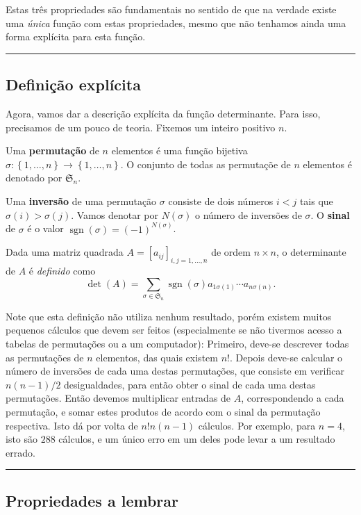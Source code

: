 Estas três propriedades são fundamentais no sentido de que na verdade existe uma \textit{única} função com estas propriedades, mesmo que não tenhamos ainda uma forma explícita para esta função.

\hrule

\subsection*{Definição explícita}

Agora, vamos dar a descrição explícita da função determinante. Para isso, precisamos de um pouco de teoria. Fixemos um inteiro positivo $n$.

Uma \textbf{permutação} de $n$ elementos é uma função bijetiva $\sigma\colon \left\{1,\ldots,n\right\}\to\left\{1,\ldots,n\right\}$. O conjunto de todas as permutaçõe de $n$ elementos é denotado por $\mathfrak{S}_n$.

Uma \textbf{inversão} de uma permutação $\sigma$ consiste de dois números $i<j$ tais que $\sigma(i)>\sigma(j)$. Vamos denotar por $N(\sigma)$ o número de inversões de $\sigma$. O \textbf{sinal} de $\sigma$ é o valor $\operatorname{sgn}(\sigma)=(-1)^{N(\sigma)}$.

Dada uma matriz quadrada $A=[a_{ij}]_{i,j=1,\ldots,n}$ de ordem $n\times n$, o determinante de $A$ é \textit{definido} como
\[\det(A)=\sum_{\sigma\in\mathfrak{S}_n}\operatorname{sgn}(\sigma)a_{1\sigma(1)}\cdots a_{n\sigma(n)}.\]

Note que esta definição não utiliza nenhum resultado, porém existem muitos pequenos cálculos que devem ser feitos (especialmente se não tivermos acesso a tabelas de permutações ou a um computador): Primeiro, deve-se descrever todas as permutações de $n$ elementos, das quais existem $n!$. Depois deve-se calcular o número de inversões de cada uma destas permutações, que consiste em verificar $n(n-1)/2$ desigualdades, para então obter o sinal de cada uma destas permutações. Então devemos multiplicar entradas de $A$, correspondendo a cada permutação, e somar estes produtos de acordo com o sinal da permutação respectiva. Isto dá por volta de $n!n(n-1)$ cálculos. Por exemplo, para $n=4$, isto são $288$ cálculos, e um único erro em um deles pode levar a um resultado errado.

\hrule

\subsection*{Propriedades a lembrar}

